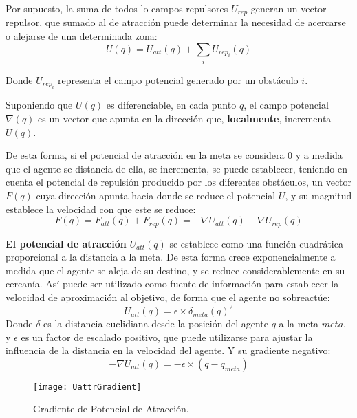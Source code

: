 Por supuesto, la suma de todos lo campos repulsores $U_{rep}$ generan un vector repulsor, que sumado al de atracción puede determinar la necesidad de acercarse o alejarse de una determinada zona:
\begin{equation}
U(q) = U_\mathit{att}(q) + \sum_i{U_\mathit{rep_i}(q)}
\label{equation:UqTotal}
\end{equation}

Donde $U_{rep_i}$ representa el campo potencial generado por un obstáculo $i$.

Suponiendo que $U(q)$ es diferenciable, en cada punto $q$, el campo potencial $\nabla(q)$ es un vector que apunta en la dirección que, \textbf{localmente}, incrementa $U(q)$. 

De esta forma, si el potencial de atracción en la meta se considera 0 y a medida que el agente se distancia de ella, se incrementa, se puede establecer, teniendo en cuenta el potencial de repulsión producido por los diferentes obstáculos, un vector $F(q)$ cuya dirección apunta hacia donde se reduce el potencial $U$, y su magnitud establece la velocidad con que este se reduce:
\begin{equation}
F(q) = F_\mathit{att}(q) + F_\mathit{rep}(q) = -\nabla U_\mathit{att}(q) - \nabla U_\mathit{rep}(q)
\label{equation:Fq}
\end{equation}


\textbf{El potencial de atracción} $U_\mathit{att}(q)$ se establece como una función cuadrática proporcional a la distancia a la meta. De esta forma crece exponencialmente a medida que el agente se aleja de su destino, y se reduce considerablemente en su cercanía. Así puede ser utilizado como fuente de información para establecer la velocidad de aproximación al objetivo, de forma que el agente no sobreactúe:
\begin{equation}
U_\mathit{att}(q) = \epsilon \times \delta_\mathit{meta}(q)^2
\label{equation:Uatt}
\end{equation}
Donde $\delta$ es la distancia euclidiana desde la posición del agente $q$ a la meta $meta$, y $\epsilon$ es un factor de escalado positivo, que puede utilizarse para ajustar la influencia de la distancia en la velocidad del agente. Y su gradiente negativo: 
\begin{equation}
-\nabla U_{att}(q) = -\epsilon \times (q - q_\mathit{meta})
\label{equation:dUatt}
\end{equation}
\begin{figure}
	\centering
	\texttt{[image: UattrGradient]}
	\caption{Gradiente de Potencial de Atracción.}\label{fig:uattrgrad}
\end{figure}

